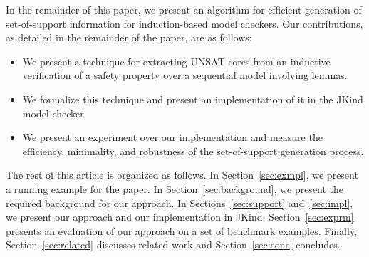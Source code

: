 In the remainder of this paper, we present an algorithm for efficient generation of set-of-support information for induction-based model checkers.  Our contributions, as detailed in the remainder of the paper, are as follows:

\begin{itemize}
    \item We present a technique for extracting UNSAT cores from an inductive verification of a safety property over a sequential model involving lemmas.
    \item We formalize this technique and present an implementation of it in the JKind model checker~\cite{jkind}
    \item We present an experiment over our implementation and measure the efficiency, minimality, and robustness of the set-of-support generation process.
\end{itemize}

The rest of this article is organized as follows. In Section~\ref{sec:exmpl}, we present a running example for the paper.  In Section~\ref{sec:background}, we present the required background for our approach.  In Sections~\ref{sec:support} and~\ref{sec:impl}, we present our approach and our implementation in JKind.  Section~\ref{sec:exprm} presents an evaluation of our approach on a set of benchmark examples.  Finally, Section~\ref{sec:related} discusses related work and Section~\ref{sec:conc} concludes.

\iffalse
\begin{itemize}
    \item Overview of the problem: sequential model checkers do not provide much insight into proofs.
    \item Section should roughly follow the structure of "Finding Minimal Unsatisfiable Cores of
        Declarative Specifications" paper by Torlak et al (with Dan Jackson).
    \item UNSAT Cores have been used for a variety of analysis tasks
    \item we want to generalize this idea for sequential systems
\end{itemize}
\fi

